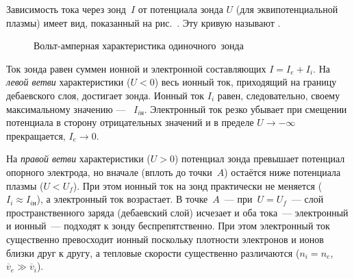 Зависимость тока через зонд~$I$ 
от потенциала зонда $U$ (для эквипотенциальной плазмы) имеет вид, 
показанный на рис.~. 
Эту кривую называют .

\begin{figure}[h]
    \centering
    \caption{Вольт-амперная характеристика одиночного~зонда}
\end{figure}

Ток зонда равен суммен ионной и электронной составляющих
$I=I_e + I_i$. 
На \emph{левой ветви} характеристики ($U<0$) весь ионный ток,
приходящий на границу дебаевского слоя, достигает зонда.
Ионный ток $I_i$ равен, следовательно, своему максимальному значению
--- ~$I_{iн}$.
Электронный ток резко убывает при смещении потенциала 
в сторону отрицательных значений и в пределе $U\to -\infty$ 
прекращается, $I_e\to 0$.

На \emph{правой ветви} характеристики ($U>0$) потенциал зонда превышает
потенциал опорного электрода, но вначале (вплоть до точки~$A$)
остаётся ниже потенциала плазмы ($U<U_f$). При этом ионный ток на зонд
практически не меняется ($I_i\approx I_{iн}$),
а электронный ток возрастает. В точке~$A$~--- при~$U=U_f$~---
слой пространственного заряда (дебаевский слой) исчезает и оба тока~---
электронный и ионный~--- подходят к зонду беспрепятственно.
При этом электронный ток существенно превосходит ионный
поскольку плотности электронов и ионов близки друг к другу, 
а тепловые скорости существенно различаются
($n_i=n_e$, $\overline{v}_e\gg \overline{v}_i$).





